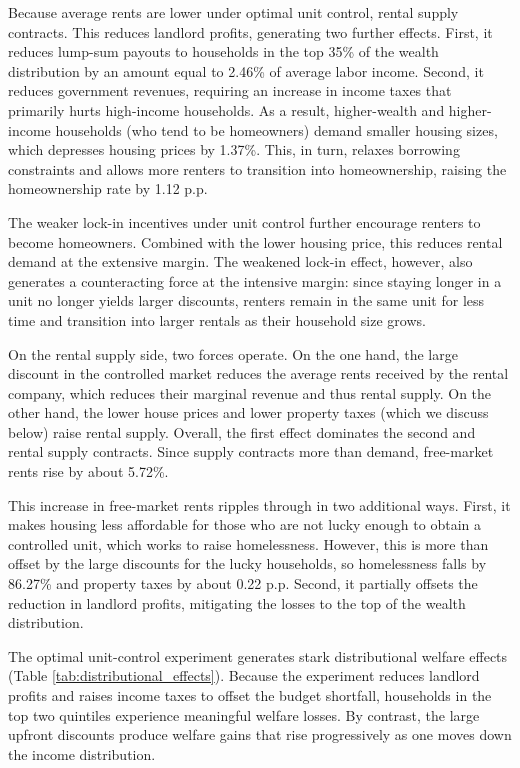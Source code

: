 \documentclass[parskip=full]{article}
\begin{document}
Because average rents are lower under optimal unit control, rental supply contracts. This reduces landlord profits, generating two further effects. First, it reduces lump-sum payouts to households in the top 35\% of the wealth distribution by an amount equal to 2.46\% of average labor income. Second, it reduces government revenues, requiring an increase in income taxes that primarily hurts high-income households. As a result, higher-wealth and higher-income households (who tend to be homeowners) demand smaller housing sizes, which depresses housing prices by 1.37\%. This, in turn, relaxes borrowing constraints and allows more renters to transition into homeownership, raising the homeownership rate by 1.12 p.p.

The weaker lock-in incentives under unit control further encourage renters to become homeowners. Combined with the lower housing price, this reduces rental demand at the extensive margin. The weakened lock-in effect, however, also generates a counteracting force at the intensive margin: since staying longer in a unit no longer yields larger discounts, renters remain in the same unit for less time and transition into larger rentals as their household size grows.

On the rental supply side, two forces operate. On the one hand, the large discount in the controlled market reduces the average rents received by the rental company, which reduces their marginal revenue and thus rental supply. On the other hand, the lower house prices and lower property taxes (which we discuss below) raise rental supply. Overall, the first effect dominates the second and rental supply contracts. Since supply contracts more than demand, free-market rents rise by about 5.72\%.

This increase in free-market rents ripples through in two additional ways. First, it makes housing less affordable for those who are not lucky enough to obtain a controlled unit, which works to raise homelessness. However, this is more than offset by the large discounts for the lucky households, so homelessness falls by 86.27\% and property taxes by about 0.22 p.p. Second, it partially offsets the reduction in landlord profits, mitigating the losses to the top of the wealth distribution.

The optimal unit-control experiment generates stark distributional welfare effects (Table \ref{tab:distributional_effects}). Because the experiment reduces landlord profits and raises income taxes to offset the budget shortfall, households in the top two quintiles experience meaningful welfare losses. By contrast, the large upfront discounts produce welfare gains that rise progressively as one moves down the income distribution.
\end{document}
